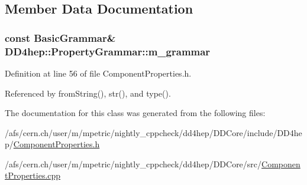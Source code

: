 \subsection{Member Data Documentation}
\hypertarget{class_d_d4hep_1_1_property_grammar_a49c47d61452e560f0186eef943cf711e}{
\subsubsection[{m\_\-grammar}]{\setlength{\rightskip}{0pt plus 5cm}const {\bf BasicGrammar}\& {\bf DD4hep::PropertyGrammar::m\_\-grammar}}}
\label{class_d_d4hep_1_1_property_grammar_a49c47d61452e560f0186eef943cf711e}


Definition at line 56 of file ComponentProperties.h.

Referenced by fromString(), str(), and type().

The documentation for this class was generated from the following files:\begin{DoxyCompactItemize}
\item 
/afs/cern.ch/user/m/mpetric/nightly\_\-cppcheck/dd4hep/DDCore/include/DD4hep/\hyperlink{_component_properties_8h}{ComponentProperties.h}\item 
/afs/cern.ch/user/m/mpetric/nightly\_\-cppcheck/dd4hep/DDCore/src/\hyperlink{_component_properties_8cpp}{ComponentProperties.cpp}\end{DoxyCompactItemize}
